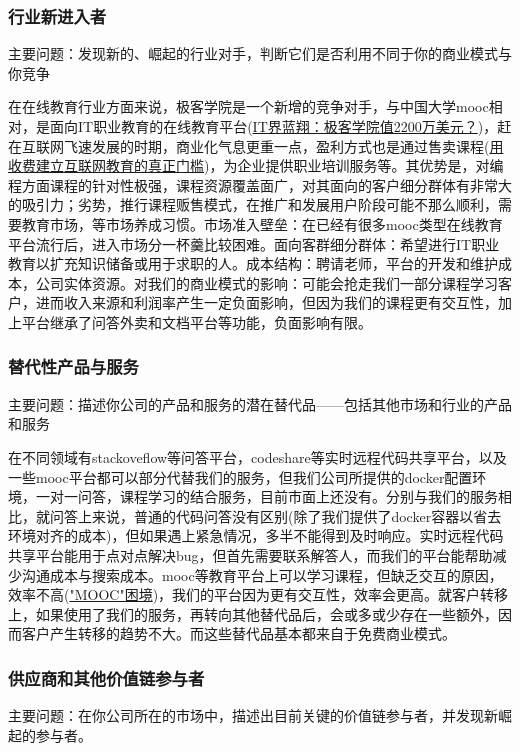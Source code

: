 \documentclass[a4paper]{ctexart}
\begin{document}
\subsubsection{行业新进入者}
主要问题：发现新的、崛起的行业对手，判断它们是否利用不同于你的商业模式与你竞争

在在线教育行业方面来说，极客学院是一个新增的竞争对手，与中国大学mooc相对，是面向IT职业教育的在线教育平台(\href{https://baijiahao.baidu.com/s?id=1568297331067975&wfr=spider&for=pc }{IT界蓝翔：极客学院值2200万美元？})，赶在互联网飞速发展的时期，商业化气息更重一点，盈利方式也是通过售卖课程(\href{http://www.quankr.com/gnzx/2019175019.html}{用收费建立互联网教育的真正门槛})，为企业提供职业培训服务等。其优势是，对编程方面课程的针对性极强，课程资源覆盖面广，对其面向的客户细分群体有非常大的吸引力；劣势，推行课程贩售模式，在推广和发展用户阶段可能不那么顺利，需要教育市场，等市场养成习惯。市场准入壁垒：在已经有很多mooc类型在线教育平台流行后，进入市场分一杯羹比较困难。面向客群细分群体：希望进行IT职业教育以扩充知识储备或用于求职的人。成本结构：聘请老师，平台的开发和维护成本，公司实体资源。对我们的商业模式的影响：可能会抢走我们一部分课程学习客户，进而收入来源和利润率产生一定负面影响，但因为我们的课程更有交互性，加上平台继承了问答外卖和文档平台等功能，负面影响有限。

\subsubsection{替代性产品与服务}
主要问题：描述你公司的产品和服务的潜在替代品——包括其他市场和行业的产品和服务

在不同领域有stackoveflow等问答平台，codeshare等实时远程代码共享平台，以及一些mooc平台都可以部分代替我们的服务，但我们公司所提供的docker配置环境，一对一问答，课程学习的结合服务，目前市面上还没有。分别与我们的服务相比，就问答上来说，普通的代码问答没有区别(除了我们提供了docker容器以省去环境对齐的成本)，但如果遇上紧急情况，多半不能得到及时响应。实时远程代码共享平台能用于点对点解决bug，但首先需要联系解答人，而我们的平台能帮助减少沟通成本与搜索成本。mooc等教育平台上可以学习课程，但缺乏交互的原因，效率不高(\href{http://media.people.com.cn/n1/2016/0309/c402792-28184701.html}{"MOOC"困境})，我们的平台因为更有交互性，效率会更高。就客户转移上，如果使用了我们的服务，再转向其他替代品后，会或多或少存在一些额外，因而客户产生转移的趋势不大。而这些替代品基本都来自于免费商业模式。

\subsubsection{供应商和其他价值链参与者}
主要问题：在你公司所在的市场中，描述出目前关键的价值链参与者，并发现新崛起的参与者。
\end{document}
